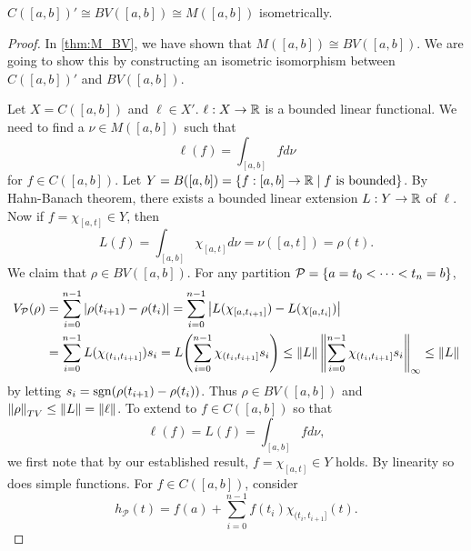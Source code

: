 \begin{theorem}
    $C([a,b])'\cong BV([a,b])\cong M([a,b])$ isometrically.
\end{theorem}
\begin{proof}
    In \cref{thm:M_BV}, we have shown that $M([a,b])\cong BV([a,b])$. 
    We are going to show this by constructing an isometric 
    isomorphism between $C([a,b])'$ and $BV([a,b])$. 

    Let $X = C([a,b])$ and $\ell\in X'$. $\ell:X\to\mathbb{R}$ is a bounded 
    linear functional. We need to find a $\nu\in M([a,b])$ such that 
    \begin{equation*}
        \ell(f) = \int_{[a,b]} f d\nu
    \end{equation*}
    for $f\in C([a,b])$. Let $Y = B([a,b]) = 
    \left\{ f:[a,b]\to\mathbb{R} \;\middle\vert\; \text{$f$ is bounded} \right\}$. By Hahn-Banach theorem, 
    there exists a bounded linear extension $L:Y\to\mathbb{R}$ of $\ell$. Now if 
    $f = \chi_{[a,t]}\in Y$, then 
    \begin{equation*}
        L(f) = \int_{[a,b]} \chi_{[a,t]} d\nu = \nu([a,t]) = \rho(t).
    \end{equation*}
    We claim that $\rho\in BV([a,b])$. For any partition $\mathcal{P} 
    = \left\{ {a = t_0 < \cdots < t_n = b} \right\}$, 
    \begin{equation*}
        \begin{split}
            V_{\mathcal{P}}(\rho) &= \sum_{i=0}^{n-1} \abs{\rho(t_{i+1})-\rho(t_i)} 
            = \sum_{i=0}^{n-1} \abs{L(\chi_{[a,t_{i+1}]})-L(\chi_{[a,t_i]})} \\
            &= \sum_{i=0}^{n-1} L(\chi_{(t_i,t_{i+1}]})s_i = L\pth{\sum_{i=0}^{n-1} \chi_{(t_i,t_{i+1}]}s_i} 
            \leq \norm{L}\norm{\sum_{i=0}^{n-1} \chi_{(t_i,t_{i+1}]}s_i}_{\infty} \leq \norm{L}
        \end{split}
    \end{equation*}
    by letting $s_i = \operatorname{sgn}(\rho(t_{i+1})-\rho(t_i))$. Thus $\rho\in BV([a,b])$ 
    and $\left\lVert {\rho} \right\rVert_{TV}\leq\left\lVert {L} \right\rVert = \left\lVert {\ell} \right\rVert$. To extend to $f\in C([a,b])$ 
    so that 
    \begin{equation*}
        \ell(f) = L(f) = \int_{[a,b]} f d\nu,
    \end{equation*}
    we first note that by our established result, $f = \chi_{[a,t]}\in Y$ 
    holds. By linearity so does simple functions. For $f\in C([a,b])$, 
    consider 
    \begin{equation*}
        h_{\mathcal{P}}(t) = f(a) + \sum_{i=0}^{n-1} f(t_i)\chi_{(t_i,t_{i+1}]}(t).

\end{equation*}
\end{proof}
